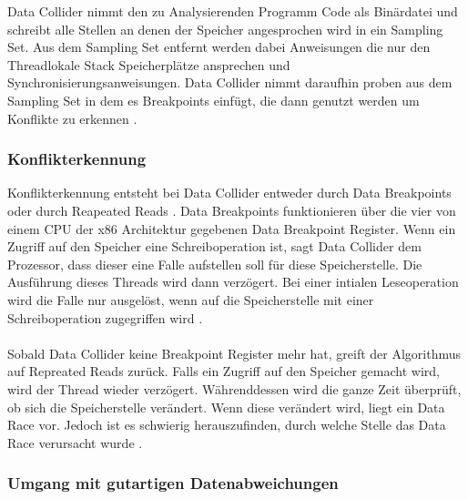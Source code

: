 Data Collider nimmt den zu Analysierenden Programm Code als Binärdatei und schreibt alle Stellen an denen der Speicher angesprochen wird in ein Sampling Set. Aus dem Sampling Set entfernt werden dabei Anweisungen die nur den Threadlokale Stack Speicherplätze ansprechen und Synchronisierungsanweisungen. Data Collider nimmt daraufhin proben aus dem Sampling Set in dem es Breakpoints einfügt, die dann genutzt werden um Konflikte zu erkennen \cite[vgl.][6]{erickson_effective_nodate}. 

\subsubsection*{Konflikterkennung}

Konflikterkennung entsteht bei Data Collider entweder durch Data Breakpoints oder durch Reapeated Reads \cite[vgl.][7]{erickson_effective_nodate}. Data Breakpoints funktionieren über die vier von einem CPU der x86 Architektur gegebenen Data Breakpoint Register. Wenn ein Zugriff auf den Speicher eine Schreiboperation ist, sagt Data Collider dem Prozessor, dass dieser eine Falle aufstellen soll für diese Speicherstelle. Die Ausführung dieses Threads wird dann verzögert. Bei einer intialen Leseoperation wird die Falle nur ausgelöst, wenn auf die Speicherstelle mit einer Schreiboperation zugegriffen wird \cite[vgl.][7-8]{erickson_effective_nodate}.\\
\\
Sobald Data Collider keine Breakpoint Register mehr hat, greift der Algorithmus auf Repreated Reads zurück. Falls ein Zugriff auf den Speicher gemacht wird, wird der Thread wieder verzögert. Währenddessen wird die ganze Zeit überprüft, ob sich die Speicherstelle verändert. Wenn diese verändert wird, liegt ein Data Race vor. Jedoch ist es schwierig herauszufinden, durch welche Stelle das Data Race verursacht wurde \cite[vgl.][7-8]{erickson_effective_nodate}. 

\subsubsection*{Umgang mit gutartigen Datenabweichungen}

